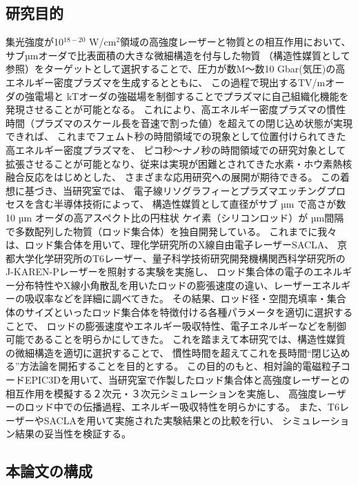 \documentclass[a4paper,11pt,titlepage]{jsarticle}
\begin{document}
  \subsection{研究目的}
  集光強度が10$^{18-20}$ W/cm$^2$領域の高強度レーザーと物質との相互作用において、サブµmオーダで比表面積の大きな微細構造を付与した物質
  （構造性媒質として参照）をターゲットとして選択することで、圧力が数M～数10 Gbar(気圧)の高エネルギー密度プラズマを生成するとともに、
  この過程で現出するTV/mオーダの強電場と kTオーダの強磁場を制御することでプラズマに自己組織化機能を発現させることが可能となる。
  これにより、高エネルギー密度プラズマの慣性時間（プラズマのスケール長を音速で割った値）を超えての閉じ込め状態が実現できれば、
  これまでフェムト秒の時間領域での現象として位置付けられてきた高エネルギー密度プラズマを、
  ピコ秒～ナノ秒の時間領域での研究対象として拡張させることが可能となり、従来は実現が困難とされてきた水素・ホウ素熱核融合反応をはじめとした、
  さまざまな応用研究への展開が期待できる。  この着想に基づき、当研究室では、
  電子線リソグラフィーとプラズマエッチングプロセスを含む半導体技術によって、
  構造性媒質として直径がサブ µm で高さが数10 µm オーダの高アスペクト比の円柱状
  ケイ素（シリコンロッド）が µm間隔で多数配列した物質（ロッド集合体）を独自開発している。
  これまでに我々は、ロッド集合体を用いて、理化学研究所のX線自由電子レーザーSACLA、
  京都大学化学研究所のT6レーザー、量子科学技術研究開発機構関西科学研究所のJ-KAREN-Pレーザーを照射する実験を実施し、
  ロッド集合体の電子のエネルギー分布特性やX線小角散乱を用いたロッドの膨張速度の違い、レーザーエネルギーの吸収率などを詳細に調べてきた。
  その結果、ロッド径・空間充填率・集合体のサイズといったロッド集合体を特徴付ける各種パラメータを適切に選択することで、
  ロッドの膨張速度やエネルギー吸収特性、電子エネルギーなどを制御可能であることを明らかにしてきた。
  これを踏まえて本研究では、構造性媒質の微細構造を適切に選択することで、
  慣性時間を超えてこれを長時間“閉じ込める”方法論を開拓することを目的とする。
  この目的のもと、相対論的電磁粒子コードEPIC3D\cite{m4}を用いて、当研究室で作製したロッド集合体と高強度レーザーとの相互作用を模擬する２次元・３次元シミュレーションを実施し、
  高強度レーザーのロッド中での伝播過程、エネルギー吸収特性を明らかにする。
  また、T6レーザーやSACLAを用いて実施された実験結果との比較を行い、
  シミュレーション結果の妥当性を検証する。



  \subsection{本論文の構成}
\end{document}
